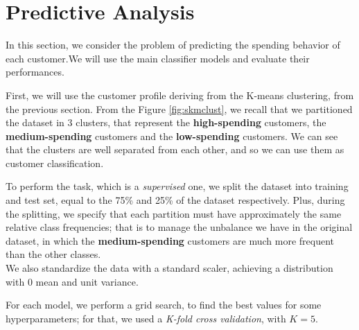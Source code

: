 \section{Predictive Analysis}
In this section, we consider the problem of predicting the spending behavior of each customer.We will use the main classifier models and evaluate their performances.

First, we will use the customer profile deriving from the K-means clustering, from the previous section.
From the Figure \ref{fig:skmclust}, we recall that we partitioned the dataset in 3 clusters, that represent the \textbf{high-spending} customers, the \textbf{medium-spending} customers and the \textbf{low-spending} customers.
We can see that the clusters are well separated from each other, and so we can use them as customer classification. 

To perform the task, which is a \emph{supervised} one, we split the dataset into training and test set, equal to the 75\% and 25\% of the dataset respectively. Plus, during the splitting, we specify that each partition must have approximately the same relative class frequencies;
that is to manage the unbalance we have in the original dataset, in which the \textbf{medium-spending} customers are much more frequent than the other classes.\\
We also standardize the data with a standard scaler, achieving a distribution with 0 mean and unit variance.

For each model, we perform a grid search, to find the best values for some hyperparameters; for that, we used a \emph{K-fold cross validation}, with $K=5$.

